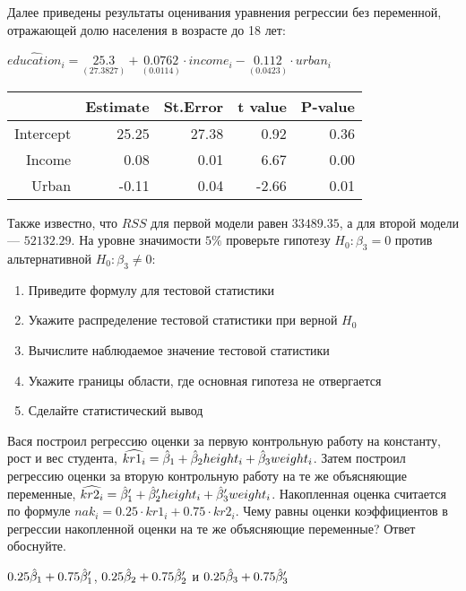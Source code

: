 \documentclass[pdftex,11pt,openany]{book}\usepackage[]{graphicx}\usepackage[]{color}
\begin{document}
\begin{problem}
\begin{enumerate}
Далее приведены результаты оценивания уравнения регрессии без переменной, отражающей долю населения в возрасте до 18 лет:
\begin{center}
\ensuremath{\widehat{education}_i=\underset{(27.3827)}{25.3}+\underset{( 0.0114)}{0.0762}\cdot income_i-\underset{( 0.0423)}{0.112}\cdot urban_i}%
\begin{table}[ht]
\centering
\begin{tabular}{rrrrr}
  \hline
 & Estimate & St.Error & t value & P-value \\ 
  \hline
Intercept & 25.25 & 27.38 & 0.92 & 0.36 \\ 
  Income & 0.08 & 0.01 & 6.67 & 0.00 \\ 
  Urban & -0.11 & 0.04 & -2.66 & 0.01 \\ 
   \hline
\end{tabular}
\end{table}


\end{center}
Также известно, что $RSS$ для первой модели равен $33489.35$, а для второй модели --- $52132.29$. На уровне значимости $5\%$ проверьте гипотезу $H_0: \beta_3 = 0$ против альтернативной $H_0: \beta_3 \not= 0$:
\begin{enumerate}
\item Приведите формулу для тестовой статистики
\item Укажите распределение тестовой статистики при верной $H_0$
\item Вычислите наблюдаемое значение тестовой статистики
\item Укажите границы области, где основная гипотеза не отвергается
\item Сделайте статистический вывод
\end{enumerate}
\end{enumerate}
\end{problem}

\begin{solution}
\end{solution}



\begin{problem}
 Вася построил регрессию оценки за первую контрольную работу на константу, рост и вес студента, $\widehat{kr1_i}=\hat{\beta}_1 + \hat{\beta}_2 height_i + \hat{\beta}_3 weight_i$. Затем построил регрессию оценки за вторую контрольную работу на те же объясняющие переменные, $\widehat{kr2_i}=\hat{\beta}_1' + \hat{\beta}_2' height_i + \hat{\beta}_3' weight_i$. Накопленная оценка считается по формуле $nak_i=0.25 \cdot kr1_i + 0.75 \cdot kr2_i$. Чему равны оценки коэффициентов в регрессии накопленной оценки на те же объясняющие переменные? Ответ обоснуйте.
\end{problem}
\begin{solution}
$0.25\hat{\beta}_1+0.75\hat{\beta}_1'$, $0.25\hat{\beta}_2+0.75\hat{\beta}_2'$ и $0.25\hat{\beta}_3+0.75\hat{\beta}_3'$
\end{solution}
\end{document}
